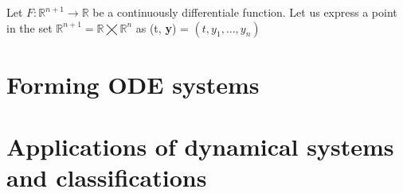 \begin{theorem}
    Let $F:\mathbb{R}^{n+1}\rightarrow\mathbb{R}$ be a continuously differentiale function. Let us express a point in the set $\mathbb{R}^{n+1} =\mathbb{R}\bigtimes\mathbb{R}^n$ as (t, \textbf{y}) = $(t, y_1, \dots, y_n)$
\end{theorem}


\section{Forming ODE systems}


\section{Applications of dynamical systems and classifications}
